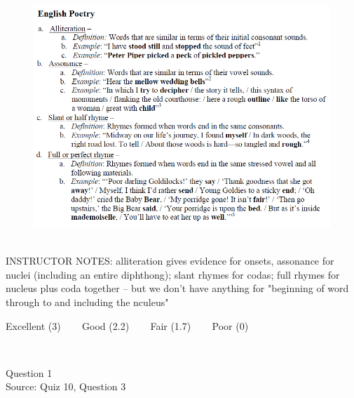 \documentclass[12pt]{article}
\begin{document}
\begin{figure}[H]
\includegraphics{../images/english_poetry.png}
\end{figure}

~\\
INSTRUCTOR NOTES: alliteration gives evidence for onsets, assonance for nuclei (including an entire diphthong); slant rhymes for codas; full rhymes for nucleus plus coda together -- but we don't have anything for "beginning of word through to and including the nculeus"


\vfill
Excellent (3) ~~~ Good (2.2) ~~~ Fair (1.7) ~~~ Poor (0)
\newpage

\begin{center}
\textbf{{\color{red}{\HUGE END OF EXAM}}}\\

\end{center}
\newpage

\begin{center}
\textbf{{\color{blue}{\HUGE START OF EXAM\\}}}

\textbf{{\color{blue}{\HUGE Student ID: 2014\\}}}

\textbf{{\color{blue}{\HUGE 12:10 - 12:30 PM\\}}}

\end{center}
\newpage

{\large Question 1}\\

Source: Quiz 10, Question 3\\
\end{document}
